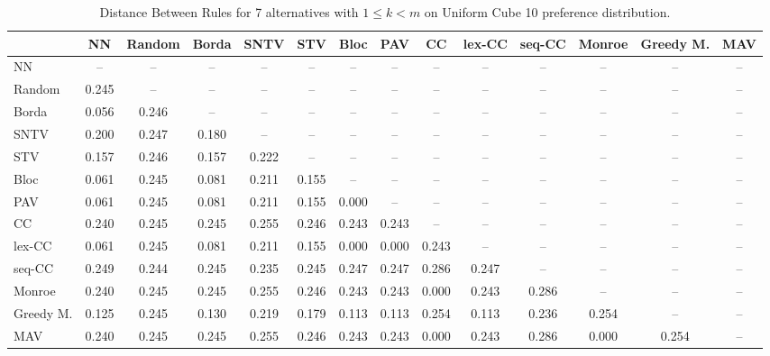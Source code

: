 
\begin{table*}
\centering
\begin{tabular}{lccccccccccccc}
\toprule
 & NN & Random & Borda & SNTV & STV & Bloc & PAV & CC & lex-CC & seq-CC & Monroe & Greedy M. & MAV \\
\midrule
NN & -- & -- & -- & -- & -- & -- & -- & -- & -- & -- & -- & -- & -- \\
Random & 0.245 & -- & -- & -- & -- & -- & -- & -- & -- & -- & -- & -- & -- \\
Borda & 0.056 & 0.246 & -- & -- & -- & -- & -- & -- & -- & -- & -- & -- & -- \\
SNTV & 0.200 & 0.247 & 0.180 & -- & -- & -- & -- & -- & -- & -- & -- & -- & -- \\
STV & 0.157 & 0.246 & 0.157 & 0.222 & -- & -- & -- & -- & -- & -- & -- & -- & -- \\
Bloc & 0.061 & 0.245 & 0.081 & 0.211 & 0.155 & -- & -- & -- & -- & -- & -- & -- & -- \\
PAV & 0.061 & 0.245 & 0.081 & 0.211 & 0.155 & 0.000 & -- & -- & -- & -- & -- & -- & -- \\
CC & 0.240 & 0.245 & 0.245 & 0.255 & 0.246 & 0.243 & 0.243 & -- & -- & -- & -- & -- & -- \\
lex-CC & 0.061 & 0.245 & 0.081 & 0.211 & 0.155 & 0.000 & 0.000 & 0.243 & -- & -- & -- & -- & -- \\
seq-CC & 0.249 & 0.244 & 0.245 & 0.235 & 0.245 & 0.247 & 0.247 & 0.286 & 0.247 & -- & -- & -- & -- \\
Monroe & 0.240 & 0.245 & 0.245 & 0.255 & 0.246 & 0.243 & 0.243 & 0.000 & 0.243 & 0.286 & -- & -- & -- \\
Greedy M. & 0.125 & 0.245 & 0.130 & 0.219 & 0.179 & 0.113 & 0.113 & 0.254 & 0.113 & 0.236 & 0.254 & -- & -- \\
MAV & 0.240 & 0.245 & 0.245 & 0.255 & 0.246 & 0.243 & 0.243 & 0.000 & 0.243 & 0.286 & 0.000 & 0.254 & -- \\
\bottomrule
\end{tabular}

\caption{Distance Between Rules for 7 alternatives with $1 \leq k < m$ on Uniform Cube 10 preference distribution.}
\end{table*}

